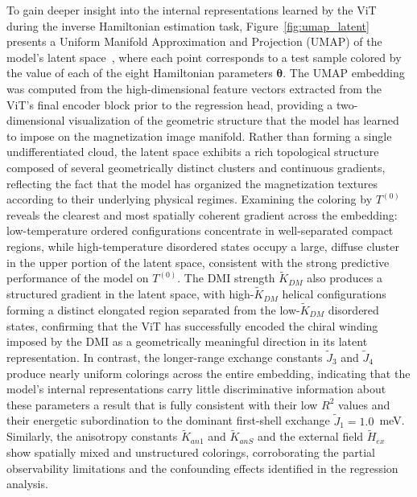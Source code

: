 \documentclass[a4paper,fleqn]{cas-sc}
\begin{document}
To gain deeper insight into the internal representations learned by 
the ViT during the inverse Hamiltonian estimation task, 
Figure~\ref{fig:umap_latent} presents a Uniform Manifold 
Approximation and Projection (UMAP) of the model's latent 
space~\cite{ghojogh2021uniform}, where each point corresponds to a 
test sample colored by the value of each of the eight Hamiltonian 
parameters $\boldsymbol{\theta}$. The UMAP embedding was computed 
from the high-dimensional feature vectors extracted from the ViT's 
final encoder block prior to the regression head, providing a 
two-dimensional visualization of the geometric structure that the 
model has learned to impose on the magnetization image manifold. 
Rather than forming a single undifferentiated cloud, the latent 
space exhibits a rich topological structure composed of several 
geometrically distinct clusters and continuous gradients, reflecting 
the fact that the model has organized the magnetization textures 
according to their underlying physical regimes. Examining the 
coloring by $T^{(0)}$ reveals the clearest and most spatially 
coherent gradient across the embedding: low-temperature ordered 
configurations concentrate in well-separated compact regions, while 
high-temperature disordered states occupy a large, diffuse cluster 
in the upper portion of the latent space, consistent with the strong 
predictive performance of the model on $T^{(0)}$. The DMI strength 
$\tilde{K}_{DM}$ also produces a structured gradient in the latent 
space, with high-$\tilde{K}_{DM}$ helical configurations forming a 
distinct elongated region separated from the low-$\tilde{K}_{DM}$ 
disordered states, confirming that the ViT has successfully encoded 
the chiral winding imposed by the DMI as a geometrically meaningful 
direction in its latent representation. In contrast, the 
longer-range exchange constants $\tilde{J}_3$ and $\tilde{J}_4$ 
produce nearly uniform colorings across the entire embedding, 
indicating that the model's internal representations carry little 
discriminative information about these parameters a result that 
is fully consistent with their low $R^2$ values and their energetic 
subordination to the dominant first-shell exchange 
$\tilde{J}_1 = 1.0$~meV. Similarly, the anisotropy constants 
$\tilde{K}_{an1}$ and $\tilde{K}_{anS}$ and the external field 
$\tilde{H}_{ex}$ show spatially mixed and unstructured colorings, 
corroborating the partial observability limitations and the 
confounding effects identified in the regression analysis.
\end{document}
